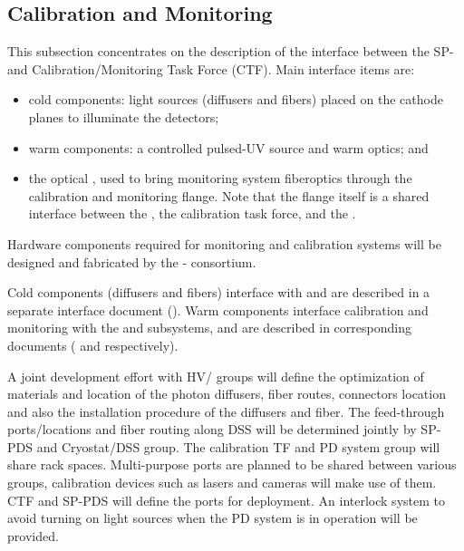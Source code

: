 \subsection{Calibration and Monitoring}
\label{sec:fdsp-pd-intfc-calib}




This subsection concentrates on the description of the interface between the SP- and Calibration/Monitoring Task Force (CTF).
 Main interface items are:
\begin{itemize}
    \item cold components: light sources (diffusers and fibers) placed on the cathode planes to illuminate the detectors;
    \item warm components: a controlled pulsed-UV source and warm optics; and 
    \item the optical \fdth, used to  bring monitoring system fiberoptics through the calibration and monitoring flange.  Note that the flange itself is a shared interface between the , the calibration task force, and the .
\end{itemize}


Hardware components required for  monitoring and calibration systems will be designed and fabricated by the - consortium. 

Cold components (diffusers and fibers) interface with  and are described in a separate interface document (). Warm components interface calibration and monitoring  with the  and  subsystems, and are described in corresponding documents ( and  respectively).


A joint development effort with HV/ groups will define the optimization of materials and location of the photon diffusers, fiber routes, connectors location and also the installation procedure of the diffusers and fiber. The feed-through ports/locations and fiber routing along DSS will be determined jointly by SP-PDS and Cryostat/DSS group. The calibration TF and PD system group will share rack spaces. Multi-purpose ports are planned to be shared between various groups, calibration devices such as lasers and cameras will make use of them. CTF and SP-PDS will define the ports for deployment. An interlock system to avoid turning on light sources when the PD system is in operation will be provided.



